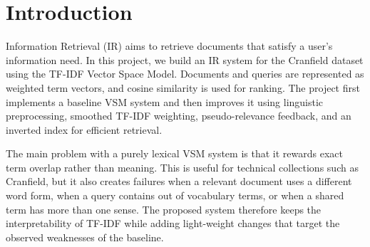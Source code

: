 \section{Introduction}\label{sec:intro}
Information Retrieval (IR) aims to retrieve documents that satisfy a user's information need. 
In this project, we build an IR system for the Cranfield dataset using the TF-IDF Vector Space Model. 
Documents and queries are represented as weighted term vectors, and cosine similarity is used for ranking.
The project first implements a baseline VSM system and then improves it using linguistic preprocessing, 
smoothed TF-IDF weighting, pseudo-relevance feedback, and an inverted index for efficient retrieval.

The main problem with a purely lexical VSM system is that it rewards exact term overlap rather than meaning.
This is useful for technical collections such as Cranfield, but it also creates failures when a relevant document
uses a different word form, when a query contains out of vocabulary terms, or when a shared term has more than one
sense. The proposed system therefore keeps the interpretability of TF-IDF while adding light-weight changes that
target the observed weaknesses of the baseline.
